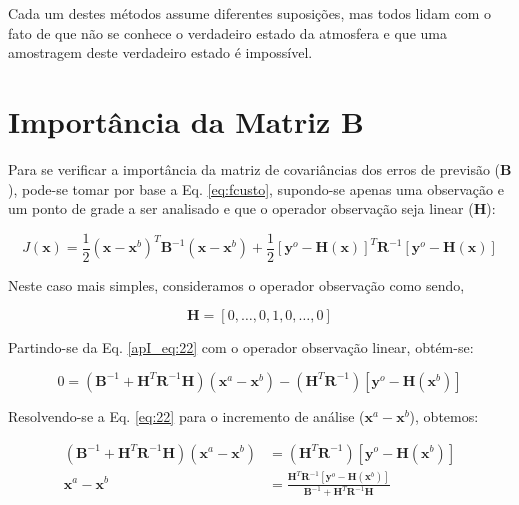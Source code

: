 Cada um destes métodos assume diferentes suposições, mas todos lidam com o fato de que não se conhece o verdadeiro estado da atmosfera e que uma amostragem deste verdadeiro estado é impossível.

\section{Importância da Matriz B}
\label{sec:import_B}

Para se verificar a importância da matriz de covariâncias dos erros de previsão ($\mathbf{B}$), pode-se tomar por base a Eq. \ref{eq:fcusto}, supondo-se apenas uma observação e um ponto de grade a ser analisado e que o operador observação seja linear ($\mathbf{H}$):

\begin{equation}
\label{eq:20}
J(\mathbf{x}) = \frac{1}{2} (\mathbf{x} - \mathbf{x}^{b})^{T} \mathbf{B}^{-1} (\mathbf{x} - \mathbf{x}^{b}) + \frac{1}{2} [\mathbf{y}^{o} - \mathbf{H}(\mathbf{x})]^{T} \mathbf{R}^{-1} [\mathbf{y}^{o} - \mathbf{H}(\mathbf{x})] \end{equation}

Neste caso mais simples, consideramos o operador observação como sendo,

\begin{equation}
\label{eq:21}
\mathbf{H}=[0,\dots,0,1,0,\dots,0]
\end{equation}

Partindo-se da Eq. \ref{apI_eq:22} com o operador observação linear, obtém-se:

\begin{equation}
\label{eq:22}
0 = (\mathbf{B}^{-1} + \mathbf{H}^{T}\mathbf{R}^{-1}\mathbf{H})(\mathbf{x}^{a} - \mathbf{x}^{b}) - (\mathbf{H}^{T}\mathbf{R}^{-1})[\mathbf{y}^{o} - \mathbf{H}(\mathbf{x}^{b})]
\end{equation}

Resolvendo-se a Eq. \ref{eq:22} para o incremento de análise ($\mathbf{x}^{a} - \mathbf{x}^{b}$), obtemos:

\begin{align}
    \label{eq:22_1}
    (\mathbf{B}^{-1} + \mathbf{H}^{T}\mathbf{R}^{-1}\mathbf{H})(\mathbf{x}^{a} - \mathbf{x}^{b}) & = (\mathbf{H}^{T}\mathbf{R}^{-1})[\mathbf{y}^{o} - \mathbf{H}(\mathbf{x}^{b})] \\
    \label{eq:22_2}
    \mathbf{x}^{a} - \mathbf{x}^{b} & = \frac{\mathbf{H}^{T}\mathbf{R}^{-1}[\mathbf{y}^{o} - \mathbf{H}(\mathbf{x}^{b})]}{\mathbf{B}^{-1} + \mathbf{H}^{T}\mathbf{R}^{-1}\mathbf{H}}
\end{align}

